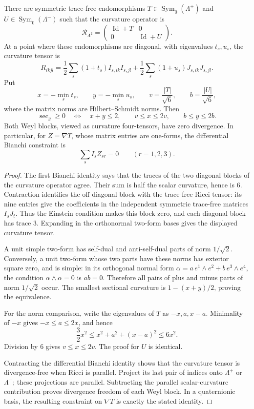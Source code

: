 \begin{lemma}
\label{lem:curvature-blocks}
There are symmetric trace-free endomorphisms
$T\in\operatorname{Sym}_0(\Lambda^+)$ and
$U\in\operatorname{Sym}_0(\Lambda^-)$ such that the curvature operator is
\[
 \mathcal R_{\Lambda^2}
 =\begin{pmatrix}\operatorname{Id}+T&0\\
                  0&\operatorname{Id}+U\end{pmatrix}.
\]
At a point where these endomorphisms are diagonal, with eigenvalues
$t_s,u_s$, the curvature tensor is
\[
 R_{ikjl}
 =\frac12\sum_s(1+t_s)I_{s,ik}I_{s,jl}
  +\frac12\sum_s(1+u_s)J_{s,ik}J_{s,jl}.
\]
Put
\[
 x=-\min_s t_s,\qquad y=-\min_s u_s,\qquad
 v=\frac{|T|}{\sqrt6},\qquad b=\frac{|U|}{\sqrt6},
\]
where the matrix norms are Hilbert--Schmidt norms. Then
\[
 \sec_g\ge0\quad\Longleftrightarrow\quad x+y\le2,
 \qquad
 v\le x\le2v,\qquad b\le y\le2b.
\]
Both Weyl blocks, viewed as curvature four-tensors, have zero
divergence. In particular, for $Z=\nabla T$, whose matrix entries are
one-forms, the differential Bianchi constraint is
\[
 \sum_s I_s Z_{sr}=0\qquad(r=1,2,3).
\]
\end{lemma}

\begin{proof}
The first Bianchi identity says that the traces of the two diagonal
blocks of the curvature operator agree. Their sum is half the scalar
curvature, hence is $6$. Contraction identifies the off-diagonal block
with the trace-free Ricci tensor: its nine entries give the coefficients
in the independent symmetric trace-free matrices $I_sJ_t$.
Thus the Einstein condition makes this block zero, and each diagonal
block has trace $3$. Expanding in the orthonormal two-form bases gives
the displayed curvature tensor.

A unit simple two-form has self-dual and anti-self-dual parts of norm
$1/\sqrt2$. Conversely, a unit two-form whose two parts have these
norms has exterior square zero, and is simple: in its orthogonal
normal form $\alpha=a\,e^1\wedge e^2+b\,e^3\wedge e^4$, the condition
$\alpha\wedge\alpha=0$ is $ab=0$. Therefore all pairs of plus and minus
parts of norm $1/\sqrt2$ occur. The smallest sectional curvature is
$1-(x+y)/2$, proving the equivalence.

For the norm comparison, write the eigenvalues of $T$ as
$-x,a,x-a$. Minimality of $-x$ gives $-x\le a\le2x$, and hence
\[
 \frac32x^2
 \le x^2+a^2+(x-a)^2
 \le6x^2.
\]
Division by $6$ gives $v\le x\le2v$. The proof for $U$ is identical.

Contracting the differential Bianchi identity shows that the curvature
tensor is divergence-free when Ricci is parallel. Project its last
pair of indices onto $\Lambda^+$ or $\Lambda^-$; these projections
are parallel. Subtracting the parallel scalar-curvature contribution
proves divergence freedom of each Weyl block. In a quaternionic basis,
the resulting constraint on $\nabla T$ is exactly the stated identity.
\end{proof}

